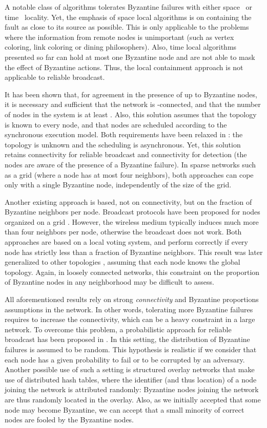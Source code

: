 \documentclass[a4paper,11pt]{article}
\begin{document}
A notable class of algorithms tolerates Byzantine failures with either space~\cite{MT07j,NA02c,SOM05c} or time~\cite{MT06cb,DMT11cb,DMT11j,DMT10cd,DMT10ca} locality. Yet, the emphasis of space local algorithms is on containing the fault as close to its source as possible. This is only applicable to the problems where the information from remote nodes is unimportant (such as vertex coloring, link coloring or dining philosophers). Also, time local algorithms presented so far can hold at most one Byzantine node and are not able to mask the effect of Byzantine actions. Thus, the local containment approach is not applicable to reliable broadcast.

It has been shown that, for agreement in the presence of up to  Byzantine nodes, it is necessary and sufficient that the network is -connected, and that the number of nodes in the system is at least  \cite{D82j}. Also, this solution assumes that the topology is known to every node, and that nodes are scheduled according to the synchronous execution model.
Both requirements have been relaxed in \cite{NT09j}: the topology is unknown and the scheduling is asynchronous. Yet, this solution retains  connectivity for reliable broadcast and  connectivity for detection (the nodes are aware of the presence of a Byzantine failure). In sparse networks such as a grid (where a node has at most four neighbors), both approaches can cope only with a single Byzantine node, independently of the size of the grid. 

Another existing approach is based, not on connectivity, but on the fraction of Byzantine neighbors per node. Broadcast protocols have been proposed for nodes organized on a grid \cite{K04c,BV05c}. However, the wireless medium typically induces much more than four neighbors per node, otherwise the broadcast does not work. Both approaches are based on a local voting system, and perform correctly if every node has strictly less than a  fraction of Byzantine neighbors. This result was later generalized to other topologies \cite{PP05j}, assuming that each node knows the global topology. Again, in loosely connected networks, this constraint on the proportion of Byzantine nodes in any neighborhood may be difficult to assess.

All aforementioned results rely on strong \emph{connectivity} and Byzantine proportions assumptions in the network. In other words, tolerating more Byzantine failures requires to increase the connectivity, which can be a heavy constraint in a large network.
To overcome this problem, a probabilistic approach for reliable broadcast has been proposed in \cite{CtrZ}. In this setting, the distribution of Byzantine failures is assumed to be random. This hypothesis is realistic if we consider that each node has a given probability to fail or to be corrupted by an adversary. Another possible use of such a setting is structured overlay networks that make use of distributed hash tables, where the identifier (and thus location) of a node joining the network is attributed randomly: Byzantine nodes joining the network are thus randomly located in the overlay. Also, as we initially accepted that some node may become Byzantine, we can accept that a small minority of correct nodes are fooled by the Byzantine nodes.
\end{document}

